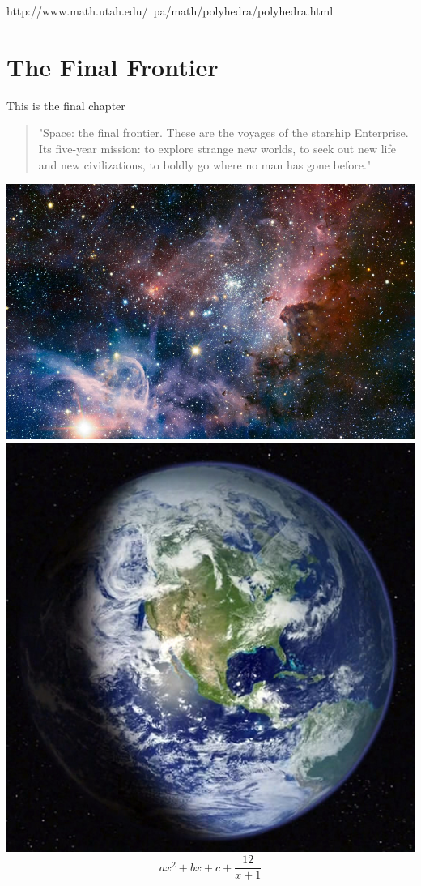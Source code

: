 \documentclass[openany,a4paper,12pt]{book}
\begin{document}
http://www.math.utah.edu/~pa/math/polyhedra/polyhedra.html
\chapter{The Final Frontier}
This is the final chapter
\begin{quotation}
"Space: \cite{greenwade93:1} the final frontier. These are the voyages of the starship Enterprise. Its five-year mission: to explore strange new worlds, to seek out new life and new civilizations, to boldly go where no man has gone before." \cite{AbedonHymanThomas03:4}
\end{quotation}
\includegraphics[angle=90,scale=0.3]{picture3.jpg}
\includegraphics[angle=90,scale=0.3]{picture4.jpg}
$$ax^2+bx+c+\dfrac{12}{x+1}$$
\listoftables
\listoffigures

\end{document}
